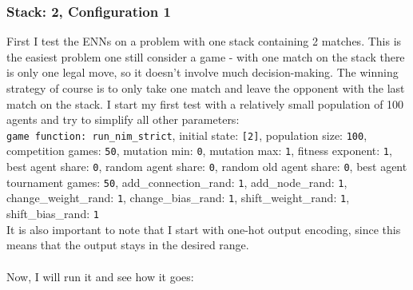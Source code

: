 \documentclass[11pt]{report}
\begin{document}
\begin{enumerate}
    \subsubsection{Stack: 2, Configuration 1}
    First I test the ENNs on a problem with one stack containing 2 matches.
    This is the easiest problem one still consider a game - with one match on the stack there is only one legal move, so it doesn't involve much decision-making.
    The winning strategy of course is to only take one match and leave the opponent with the last match on the stack.
    I start my first test with a relatively small population of 100 agents and try to simplify all other parameters:
    \\
    \texttt{game function: run\_nim\_strict}, initial state: \texttt{[2]}, population size: \texttt{100}, competition games: \texttt{50}, mutation min: \texttt{0}, mutation max: \texttt{1}, fitness exponent: \texttt{1}, best agent share:
    \texttt{0}, random agent share: \texttt{0}, random old agent share: \texttt{0}, best agent tournament games: \texttt{50}, add\_connection\_rand: \texttt{1}, add\_node\_rand: \texttt{1}, change\_weight\_rand: \texttt{1}, change\_bias\_rand: \texttt{1}, shift\_weight\_rand: \texttt{1}, shift\_bias\_rand: \texttt{1}\\
    It is also important to note that I start with one-hot output encoding, since this means that the output stays in the desired range.
    \\ \\
    Now, I will run it and see how it goes:
    \\
    \newcommand{\csvpath}{../data/simple_nim/stack_2/t_1/stats.csv} %
    \begin{center}
\end{center}
\end{enumerate}
\end{document}
